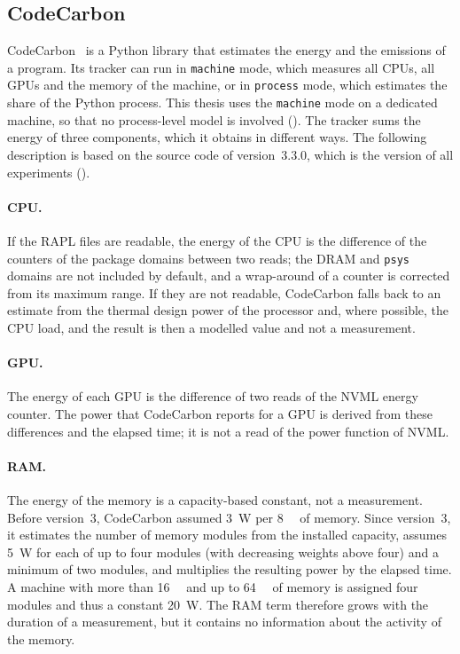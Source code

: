 \subsection{CodeCarbon}\label{sec:codecarbon}

CodeCarbon~\cite{codecarbon,courty2024codecarbon} is a Python library that estimates the energy and the emissions of a program.
Its tracker can run in \texttt{machine} mode, which measures all CPUs, all GPUs and the memory of the machine, or in \texttt{process} mode, which estimates the share of the Python process.
This thesis uses the \texttt{machine} mode on a dedicated machine, so that no process-level model is involved ().
The tracker sums the energy of three components, which it obtains in different ways.
The following description is based on the source code of version~3.3.0, which is the version of all experiments ().

\paragraph{CPU.} If the RAPL files are readable, the energy of the CPU is the difference of the counters of the package domains between two reads; the DRAM and \texttt{psys} domains are not included by default, and a wrap-around of a counter is corrected from its maximum range.
If they are not readable, CodeCarbon falls back to an estimate from the thermal design power of the processor and, where possible, the CPU load, and the result is then a modelled value and not a measurement.

\paragraph{GPU.} The energy of each GPU is the difference of two reads of the NVML energy counter.
The power that CodeCarbon reports for a GPU is derived from these differences and the elapsed time; it is not a read of the power function of NVML.

\paragraph{RAM.} The energy of the memory is a capacity-based constant, not a measurement.
Before version~3, CodeCarbon assumed \SI{3}{\watt} per \SI{8}{\giga\byte} of memory.
Since version~3, it estimates the number of memory modules from the installed capacity, assumes \SI{5}{\watt} for each of up to four modules (with decreasing weights above four) and a minimum of two modules, and multiplies the resulting power by the elapsed time.
A machine with more than \SI{16}{\giga\byte} and up to \SI{64}{\giga\byte} of memory is assigned four modules and thus a constant \SI{20}{\watt}.
The RAM term therefore grows with the duration of a measurement, but it contains no information about the activity of the memory.

